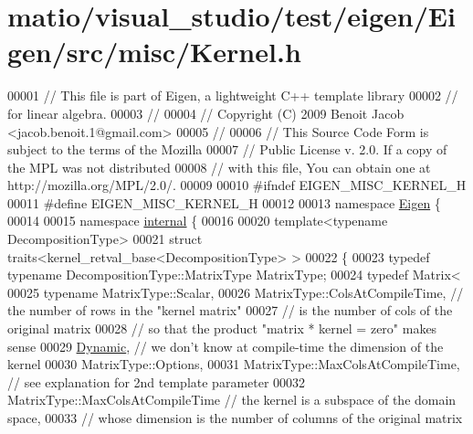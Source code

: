 \hypertarget{matio_2visual__studio_2test_2eigen_2_eigen_2src_2misc_2_kernel_8h_source}{}\section{matio/visual\+\_\+studio/test/eigen/\+Eigen/src/misc/\+Kernel.h}
\label{matio_2visual__studio_2test_2eigen_2_eigen_2src_2misc_2_kernel_8h_source}

\begin{DoxyCode}
00001 \textcolor{comment}{// This file is part of Eigen, a lightweight C++ template library}
00002 \textcolor{comment}{// for linear algebra.}
00003 \textcolor{comment}{//}
00004 \textcolor{comment}{// Copyright (C) 2009 Benoit Jacob <jacob.benoit.1@gmail.com>}
00005 \textcolor{comment}{//}
00006 \textcolor{comment}{// This Source Code Form is subject to the terms of the Mozilla}
00007 \textcolor{comment}{// Public License v. 2.0. If a copy of the MPL was not distributed}
00008 \textcolor{comment}{// with this file, You can obtain one at http://mozilla.org/MPL/2.0/.}
00009 
00010 \textcolor{preprocessor}{#ifndef EIGEN\_MISC\_KERNEL\_H}
00011 \textcolor{preprocessor}{#define EIGEN\_MISC\_KERNEL\_H}
00012 
00013 \textcolor{keyword}{namespace }\hyperlink{namespace_eigen}{Eigen} \{ 
00014 
00015 \textcolor{keyword}{namespace }\hyperlink{namespaceinternal}{internal} \{
00016 
00020 \textcolor{keyword}{template}<\textcolor{keyword}{typename} DecompositionType>
00021 \textcolor{keyword}{struct }traits<kernel\_retval\_base<DecompositionType> >
00022 \{
00023   \textcolor{keyword}{typedef} \textcolor{keyword}{typename} DecompositionType::MatrixType MatrixType;
00024   \textcolor{keyword}{typedef} Matrix<
00025     \textcolor{keyword}{typename} MatrixType::Scalar,
00026     MatrixType::ColsAtCompileTime, \textcolor{comment}{// the number of rows in the "kernel matrix"}
00027                                    \textcolor{comment}{// is the number of cols of the original matrix}
00028                                    \textcolor{comment}{// so that the product "matrix * kernel = zero" makes sense}
00029     \hyperlink{namespace_eigen_ad81fa7195215a0ce30017dfac309f0b2}{Dynamic},                       \textcolor{comment}{// we don't know at compile-time the dimension of the kernel}
00030     MatrixType::Options,
00031     MatrixType::MaxColsAtCompileTime, \textcolor{comment}{// see explanation for 2nd template parameter}
00032     MatrixType::MaxColsAtCompileTime \textcolor{comment}{// the kernel is a subspace of the domain space,}
00033                                      \textcolor{comment}{// whose dimension is the number of columns of the original matrix}

\end{DoxyCode}
